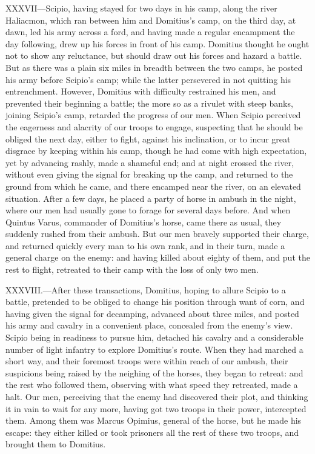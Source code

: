XXXVII—Scipio, having stayed for two days in his camp, along the river
Haliacmon, which ran between him and Domitius's camp, on the third day,
at dawn, led his army across a ford, and having made a regular
encampment the day following, drew up his forces in front of his camp.
Domitius thought he ought not to show any reluctance, but should draw
out his forces and hazard a battle. But as there was a plain six miles
in breadth between the two camps, he posted his army before Scipio's
camp; while the latter persevered in not quitting his entrenchment.
However, Domitius with difficulty restrained his men, and prevented
their beginning a battle; the more so as a rivulet with steep banks,
joining Scipio's camp, retarded the progress of our men. When Scipio
perceived the eagerness and alacrity of our troops to engage, suspecting
that he should be obliged the next day, either to fight, against his
inclination, or to incur great disgrace by keeping within his camp,
though he had come with high expectation, yet by advancing rashly, made
a shameful end; and at night crossed the river, without even giving the
signal for breaking up the camp, and returned to the ground from which
he came, and there encamped near the river, on an elevated situation.
After a few days, he placed a party of horse in ambush in the night,
where our men had usually gone to forage for several days before. And
when Quintus Varus, commander of Domitius's horse, came there as usual,
they suddenly rushed from their ambush. But our men bravely supported
their charge, and returned quickly every man to his own rank, and in
their turn, made a general charge on the enemy: and having killed about
eighty of them, and put the rest to flight, retreated to their camp with
the loss of only two men.

XXXVIII.—After these transactions, Domitius, hoping to allure Scipio to
a battle, pretended to be obliged to change his position through want of
corn, and having given the signal for decamping, advanced about three
miles, and posted his army and cavalry in a convenient place, concealed
from the enemy's view. Scipio being in readiness to pursue him, detached
his cavalry and a considerable number of light infantry to explore
Domitius's route. When they had marched a short way, and their foremost
troops were within reach of our ambush, their suspicions being raised by
the neighing of the horses, they began to retreat: and the rest who
followed them, observing with what speed they retreated, made a halt.
Our men, perceiving that the enemy had discovered their plot, and
thinking it in vain to wait for any more, having got two troops in their
power, intercepted them. Among them was Marcus Opimius, general of the
horse, but he made his escape: they either killed or took prisoners all
the rest of these two troops, and brought them to Domitius.

